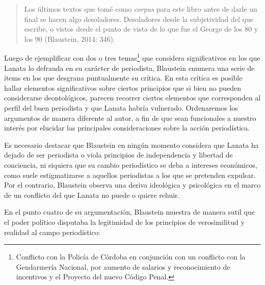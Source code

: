 \begin{quote}
Los últimos textos que tomé como \emph{corpus} para este libro antes de darle un final se hacen algo desoladores. Desoladores desde la subjetividad del que escribe, o vistos desde el punto de vista de lo que fue el George de los 80 y los 90 (Blaustein, 2014: 346).
\end{quote}

Luego de ejemplificar con dos o tres temas\footnote{Conflicto con la Policía de Córdoba en conjunción con un conflicto con la Gendarmería Nacional, por aumento de salarios y reconocimiento de incentivos y el Proyecto del nuevo Código Penal.} que considera significativos en los que Lanata lo defrauda en su carácter de periodista, Blaustein enumera una serie de ítems en los que desgrana puntualmente su crítica. En esta crítica es posible hallar elementos significativos sobre ciertos principios que si bien no pueden considerarse deontológicos, parecen recorrer ciertos elementos que corresponden al perfil del buen periodista y que Lanata habría vulnerado. Ordenaremos los argumentos de manera diferente al autor, a fin de que sean funcionales a nuestro interés por elucidar las principales consideraciones sobre la acción periodística.

Es necesario destacar que Blaustein en ningún momento considera que Lanata ha dejado de ser periodista o viola principios de independencia y libertad de conciencia, ni siquiera que su cambio periodístico se deba a intereses económicos, como suele estigmatizarse a aquellos periodistas a los que se pretenden expulsar. Por el contrario, Blaustein observa una deriva ideológica y psicológica en el marco de un conflicto del que Lanata no puede o quiere rehuir.

En el punto cuatro de su argumentación, Blaustein muestra de manera sutil que el poder político disputaba la legitimidad de los principios de verosimilitud y realidad al campo periodístico:

